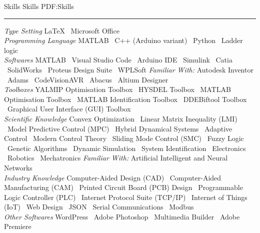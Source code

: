 \documentclass[letterpaper,MMMyyyy,nonstopmode]{ResumeTemplate}
\begin{document}
\begin{Body}

\Section
{Skills}
{Skills}
{PDF:Skills}
\textcolor{Forestg}{\vspace{0.05cm}\hrule height 0.1cm}\BigGap
\BulletItem
\textit{Type Setting}
\newline
{\LaTeX} \textbullet\ Microsoft Office
\\
\vspace{5pt}
\BulletItem
\textit{Programming Language}
\newline
MATLAB \textbullet\ 
C++ (Arduino variant) \textbullet\ 
Python \textbullet\ 
Ladder logic
\\
\vspace{5pt}
\BulletItem
\textit{Softwares}
\newline
MATLAB \textbullet\ 
Visual Studio Code \textbullet\ 
Arduino IDE \textbullet\ 
Simulink \textbullet\ 
Catia \textbullet\
SolidWorks \textbullet\
Proteus Design Suite \textbullet\
WPLSoft
\newline
\textit{Familiar With:}
Autodesk Inventor \textbullet\
Adams \textbullet\
CodeVisionAVR \textbullet\ 
Abacus \textbullet\ 
Altium Designer
\\
\vspace{5pt}
\BulletItem
\textit{Toolboxes}
\newline
YALMIP Optimisation Toolbox \textbullet\
HYSDEL Toolbox \textbullet\
MATLAB Optimisation Toolbox \textbullet\
MATLAB Identification Toolbox \textbullet\
DDEBiftool Toolbox \textbullet\
Graphical User Interface (GUI) Toolbox
\\
\vspace{5pt}
\BulletItem
\textit{Scientific Knowledge}
\newline 
Convex Optimization \textbullet\
Linear Matrix Inequality (LMI) \textbullet\
Model Predictive Control (MPC) \textbullet\
Hybrid Dynamical Systems \textbullet\
Adaptive Control \textbullet\
Modern Control Theory \textbullet\
Sliding Mode Control (SMC) \textbullet\
Fuzzy Logic \textbullet\
Genetic Algorithms \textbullet\ 
Dynamic Simulation \textbullet\
System Identification \textbullet\
Electronics \textbullet\ 
Robotics \textbullet\
Mechatronics 
\newline
\textit{Familiar With:} Artificial Intelligent and Neural Networks
\\
\vspace{5pt}
\BulletItem
\textit{Industry Knowledge}
\newline
Computer-Aided Design (CAD) \textbullet\
Computer-Aided Manufacturing (CAM) \textbullet\
Printed Circuit Board (PCB) Design \textbullet\
Programmable Logic Controller (PLC) \textbullet\
Internet Protocol Suite (TCP/IP) \textbullet\
Internet of Things (IoT) \textbullet\
Web Design \textbullet\
JSON \textbullet\
Serial Communications \textbullet\ Modbus
\\
\vspace{5pt}
\BulletItem
\textit{Other Softwares}
\newline
WordPress \textbullet\ Adobe Photoshop \textbullet\ Multimedia Builder \textbullet\ Adobe Premiere


\end{Body}
\end{document}
